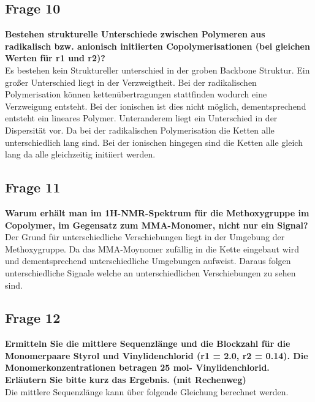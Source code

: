 \documentclass[10pt,a4paper,ngerman]{scrartcl}
\begin{document}
	\subsection{Frage 10}

		\textbf{Bestehen strukturelle Unterschiede zwischen Polymeren aus radikalisch bzw.
				anionisch initiierten Copolymerisationen (bei gleichen Werten für r1 und r2)?}\\
		
		Es bestehen kein Struktureller unterschied in der groben Backbone Struktur. Ein großer Unterschied liegt in der Verzweigtheit. 
		Bei der radikalischen Polymerisation können kettenübertragungen stattfinden wodurch eine Verzweigung entsteht.
		Bei der ionischen ist dies nicht möglich, dementsprechend entsteht ein lineares Polymer.
		Unteranderem liegt ein Unterschied in der Dispersität vor. Da bei der radikalischen Polymerisation die Ketten alle unterschiedlich lang sind.
		Bei der ionischen hingegen sind die Ketten alle gleich lang da alle gleichzeitig initiiert werden.
		
	\subsection{Frage 11}

		\textbf{Warum erhält man im 1H-NMR-Spektrum für die Methoxygruppe im
				Copolymer, im Gegensatz zum MMA-Monomer, nicht nur ein Signal?}\\
		
		Der Grund für unterschiedliche Verschiebungen liegt in der Umgebung der Methoxygruppe.
		Da das MMA-Moynomer zufällig in die Kette eingebaut wird und dementsprechend unterschiedliche Umgebungen aufweist.
		Daraus folgen unterschiedliche Signale welche an unterschiedlichen Verschiebungen zu sehen sind.

	\subsection{Frage 12}

		\textbf{Ermitteln Sie die mittlere Sequenzlänge und die Blockzahl für die
				Monomerpaare Styrol und Vinylidenchlorid (r1 = 2.0, r2 = 0.14). Die Monomerkonzentrationen betragen 25 mol-%
				Vinylidenchlorid. Erläutern Sie bitte kurz das Ergebnis. (mit Rechenweg)}\\
		
		Die mittlere Sequenzlänge kann über folgende Gleichung berechnet werden.	
			
\end{document}
